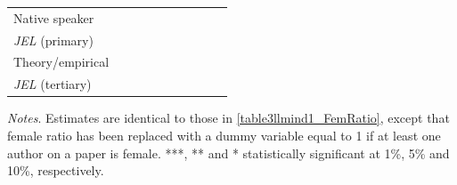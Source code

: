 \begin{table}
\begin{threeparttable}
\begin{tabular}{p{4.5cm}S@{}S@{}S@{}S@{}S@{}S@{}S@{}S@{}S@{}}
            Native speaker                &               &               &               &               &           {}   &           {}   &           {}   &           {}   &           {}   \\
            \textit{JEL} (primary)        &               &               &               &               &               &               &           {}   &               &               \\
            Theory/empirical              &               &               &               &               &               &               &               &           {}   &               \\
            \textit{JEL} (tertiary)       &               &               &               &               &               &               &               &               &           {}   \\
            \bottomrule
        \end{tabular}
        \begin{tablenotes}
            \tiny
            \item \textit{Notes}. Estimates are identical to those in \autoref{table3llmind1_FemRatio}, except that female ratio has been replaced with a dummy variable equal to 1 if at least one author on a paper is female. ***, ** and * statistically significant at 1\%, 5\% and 10\%, respectively.
        \end{tablenotes}
    \end{threeparttable}

\end{table}
